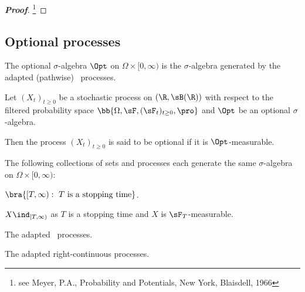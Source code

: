 \begin{proof}[\bf Proof]
\footnote{see Meyer, P.A., Probability and Potentials, New York, Blaisdell, 1966}
\end{proof}


\subsection{Optional processes}%

\begin{definition}\label{def:progressive_sigma_algebra}
The optional $\sigma$-algebra $\Opt$ on $\Omega \times [0,\infty)$ is the $\sigma$-algebra generated by the adapted (pathwise) \cadlag\ processes.%
\end{definition}


\begin{definition}
\label{def:optimal_stochastic_process}%
Let $(X_t)_{t\geq 0}$ be a stochastic process on $(\R,\sB(\R))$ with respect to the filtered probability space $\bb{\Omega,\sF,(\sF_t)_{t\geq 0},\pro}$ and $\Opt$ be an optional $\sigma$-algebra. 

Then the process $(X_t)_{t\geq 0}$ is said to be optional if it is $\Opt$-measurable.
\end{definition}


\begin{theorem}
The following collections of sets and processes each generate the same $\sigma$-algebra on $\Omega\times [0,\infty)$:
\ben
\item [(i)] $\bra{[T,\infty):\ T \text{ is a stopping time}}$.
\item [(ii)] $X\ind_{[T,\infty)}$ as $T$ is a stopping time and $X$ is $\sF_T$-measurable.
\item [(iii)] The adapted \cadlag\  processes.
\item [(iv)] The adapted right-continuous processes.
\een
\end{theorem}


